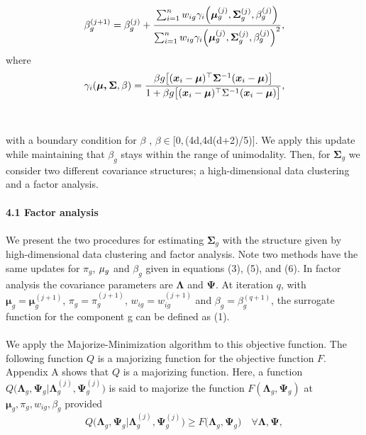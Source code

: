 \documentclass[11pt]{article}
\begin{document}
\\ \\
\begin{equation}
\beta_g^{(j+1)} = \beta_g^{(j)}+\frac{\sum_{i=1}^nw_{ig}\gamma_i\Bigl(\boldsymbol{\mu}_g^{(j)},\boldsymbol{\Sigma}_g^{(j)},\beta_g^{(j)}\Bigr)}{\sum_{i=1}^nw_{ig}\gamma_i\Bigl(\boldsymbol{\mu}_g^{(j)},\boldsymbol{\Sigma}_g^{(j)},\beta_g^{(j)}\Bigr)^2},
\end{equation}
where $$\gamma_i(\boldsymbol{\mu,\Sigma},\beta) = \frac{\beta g\bigl[(\boldsymbol{x}_i-\boldsymbol{\mu})^{\top}\bold{\Sigma}^{-1}(\boldsymbol{x}_i-\boldsymbol{\mu})\bigr]}{1+\beta g\bigl[(\boldsymbol{x}_i-\boldsymbol{\mu})^{\top}\Sigma^{-1}(\boldsymbol{x}_i-\boldsymbol{\mu})\bigr]},$$
\\ \\
with a boundary condition for $\beta$ \citep{bagnato2017multivariate}, $\beta \in [0,$(4d,4d(d+2)/5)$]$. We apply this update while maintaining that $\beta_g$ stays within the range of unimodality. Then, for $\boldsymbol{\Sigma}_g$ we consider two different covariance structures; a high-dimensional data clustering and a factor analysis.\\
\\
\textbf{4.1 Factor analysis}\\
\\
We present the two procedures for estimating $\boldsymbol{\Sigma}_g$ with the structure given by high-dimensional data clustering and factor analysis. Note two methods have the same updates for $\pi_g$, $\bold{\mu}_g$ and $\beta_g$ given in equations (3), (5), and (6). In factor analysis the covariance parameters are $\boldsymbol{\Lambda}$ and $\boldsymbol{\Psi}$. At iteration $q$, with $\boldsymbol{\mu}_g = \boldsymbol{\mu}_g^{(j+1)}$, $\pi_g = \pi_g^{(j+1)}$, $w_{ig}=w_{ig}^{(j+1)}$ and $\beta_g = \beta_g^{(q+1)}$, the surrogate function for the component g can be defined as (1).\\
\\
We apply the Majorize-Minimization algorithm \citep{hunter2004tutorial} to this objective function. The following function $Q$ is a majorizing function for the objective function $F$. Appendix A shows that $Q$ is a  majorizing function. Here, a function $Q\bigl(\boldsymbol{\Lambda}_g,\boldsymbol{\Psi}_g|\boldsymbol{\Lambda}_g^{(j)},\boldsymbol{\Psi}_g^{(j)}\bigr)$ is said to majorize the function $F(\boldsymbol{\Lambda}_g,\boldsymbol{\Psi}_g)$ at $\boldsymbol{\mu}_g,\pi_g, w_{ig}, \beta_g$ provided
\\
$$Q\bigl(\boldsymbol{\Lambda}_g,\boldsymbol{\Psi}_g|\boldsymbol{\Lambda}_g^{(j)},\boldsymbol{\Psi}_g^{(j)}\bigr) \geq F\bigl(\boldsymbol{\Lambda}_g,\boldsymbol{\Psi}_g\bigr) \quad \forall \boldsymbol{\Lambda},\boldsymbol{\Psi},$$
\end{document}
